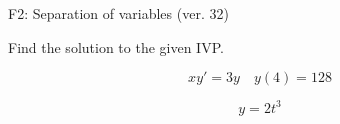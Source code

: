 \begin{exercise}
  \begin{exerciseTitle}F2: Separation of variables (ver. 32)\end{exerciseTitle}
  \begin{exerciseStatement}
    
Find the solution to the given IVP.

    
\[xy'= 3 y \hspace{1em} y( 4 ) = 128\]

  \end{exerciseStatement}
  \begin{exerciseAnswer}
    
\[y= 2 t^ 3\]

  \end{exerciseAnswer}
\end{exercise}